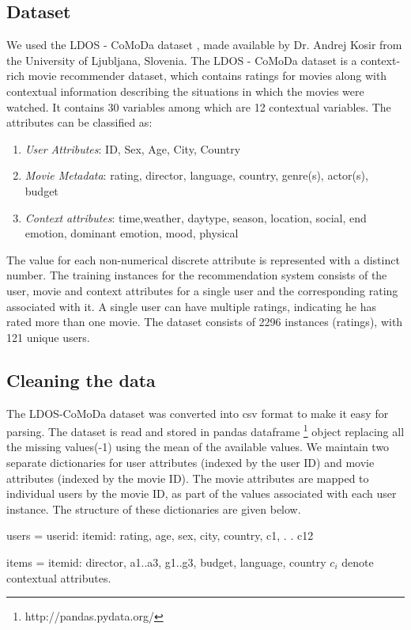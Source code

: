\documentclass{article}
\begin{document}
\subsection{Dataset}
We used the LDOS - CoMoDa dataset \cite{kovsir2011database}, made available by Dr. Andrej Kosir from the University of Ljubljana, Slovenia. The LDOS - CoMoDa dataset is a context-rich movie recommender dataset, which contains ratings for movies along with contextual information describing the situations in which the movies were watched. 
It contains 30 variables among which are 12 contextual variables. The attributes can be classified as:
\begin{enumerate}
\item \emph{User Attributes}: ID, Sex, Age, City, Country
\item \emph{Movie Metadata}: rating, director, language, country, genre(s), actor(s), budget
\item \emph{Context attributes}: time,weather, daytype, season, location, social, end emotion, dominant emotion, mood, physical
\end{enumerate}
The value for each non-numerical discrete attribute is represented with a distinct number. The training instances for the recommendation system consists of the user, movie and context attributes for a single user and the corresponding rating associated with it. A single user can have multiple ratings, indicating he has rated more than one movie. The dataset consists of 2296 instances (ratings), with 121 unique users. 

\subsection{Cleaning the data}

The LDOS-CoMoDa dataset was converted into csv format to make it easy for parsing. The dataset is read and stored in pandas dataframe \footnote{http://pandas.pydata.org/} object replacing all the missing values(-1) using the mean of the available values. We maintain two separate dictionaries for user attributes (indexed by the user ID) and movie attributes (indexed by the movie ID). The movie attributes are mapped to individual users by the movie ID, as part of the values associated with each user instance. The structure of these dictionaries are given below.

users = 
	{userid: 
		{itemid:  
			rating, 
			age,
			sex,
			city,
			country, 
			c1,
			.
			.
			c12}}

items = 
	{itemid: 
		{director, 
		a1..a3,
		g1..g3, 
		budget, 
		language, 
		country}}
$c_{i}$ denote contextual attributes.
\end{document}

